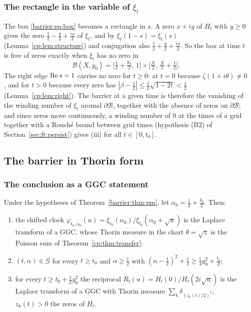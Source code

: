\subsubsection{The rectangle in the variable of \texorpdfstring{$\xi_t$}{xi t}}

The box \eqref{barrier:eq:box} becomes a rectangle in $s$. A zero $x+iy$ of $H_t$ with $y\ge0$ gives the zero $\frac12-\frac y2+\frac{ix}2$ of $\xi_t$, and by $\xi_t(1-s)=\xi_t(s)$ (Lemma~\ref{cp:lem:structure}) and conjugation also $\frac12+\frac y2+\frac{ix}2$. So the box at time $t$ is free of zeros exactly when $\xi_t$ has no zero in
\begin{equation}\label{barrier:eq:B}
\mathcal B(X,y_0)=\big[\tfrac12+\tfrac{y_0}2,\,1\big]\times\big[\tfrac X2,\,\tfrac X2+\tfrac12\big].
\end{equation}
The right edge $\operatorname{Re} s=1$ carries no zero for $t\ge0$: at $t=0$ because $\zeta(1+i\theta)\ne0$, and for $t>0$ because every zero has $|\beta-\frac12|\le\frac12\sqrt{1-2t}<\frac12$ (Lemma~\ref{cp:lem:right}). The barrier at a given time is therefore the vanishing of the winding number of $\xi_t$ around $\partial\mathcal B$, together with the absence of zeros on $\partial\mathcal B$; and since zeros move continuously, a winding number of $0$ at the times of a grid together with a Rouch\'e bound between grid times (hypothesis (B2) of Section~\ref{sec:ft:persist}) gives (iii) for all $t\in[0,t_0]$.

\subsection{The barrier in Thorin form}\label{barrier:sec:thorin}

\subsubsection{The conclusion as a GGC statement}

\begin{proposition}\label{barrier:prop:ggc}
Under the hypotheses of Theorem~\ref{barrier:thm:pm}, let $\alpha_0=\frac12+\frac{y_0}2$. Then:
\begin{enumerate}
\item[(a)] the shifted clock $\varphi_{t_0,\alpha_0}(u)=\xi_{t_0}(\alpha_0)/\xi_{t_0}(\alpha_0+\sqrt u)$ is the Laplace transform of a GGC, whose Thorin measure in the chart $\theta=\sqrt z$ is the Poisson sum of Theorem~\ref{cp:thm:transfer};
\item[(b)] $(t,\alpha)\in\mathcal G$ for every $t\ge t_0$ and $\alpha\ge\frac12$ with $(\alpha-\frac12)^2+\frac t2\ge\frac14y_0^2+\frac{t_0}2$;
\item[(c)] for every $t\ge t_0+\frac12y_0^2$ the reciprocal $R_t(u)=H_t(0)/H_t(2i\sqrt u)$ is the Laplace transform of a GGC with Thorin measure $\sum_k\delta_{(z_k(t)/2)^2}$, $z_k(t)>0$ the zeros of $H_t$.
\end{enumerate}
\end{proposition}

